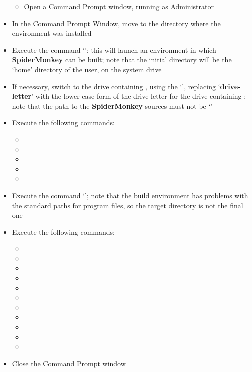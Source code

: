 \begin{itemize}
\begin{itemize}
\item\exSp{}Open a Command Prompt window, running as Administrator
\end{itemize}
\item\exSp{}In the Command Prompt Window, move to the directory where the
 environment was installed
\item\exSp{}Execute the command `'; this will launch
an environment in which \textbf{SpiderMonkey} can be built; note that the initial
directory will be the `home' directory of the user, on the system drive
\item\exSp{}If necessary, switch to the drive containing ,
using the `', replacing `\textbf{drive-letter}' with
the lower-case form of the drive letter for the drive containing
; note that the path to the \textbf{SpiderMonkey} sources
must not be `'
\item\exSp{}Execute the following commands:
\begin{itemize}
\item {}
\item\exSp{}
\item\exSp{}
\item\exSp{}
\item\exSp{}
\end{itemize}
\item\exSp{}Execute the command `'; note that the build environment has problems with the
standard \win{} paths for program files, so the target directory is not the final one
\item\exSp{}Execute the following commands:
\begin{itemize}
\item {}
\item\exSp{}
\item\exSp{}
\item\exSp{}
\item\exSp{}
\item\exSp{}
\item\exSp{}
\item\exSp{}
\item\exSp{}
\item\exSp{}
\item\exSp{}
\end{itemize}
\item\exSp{}Close the Command Prompt window
\end{itemize}
